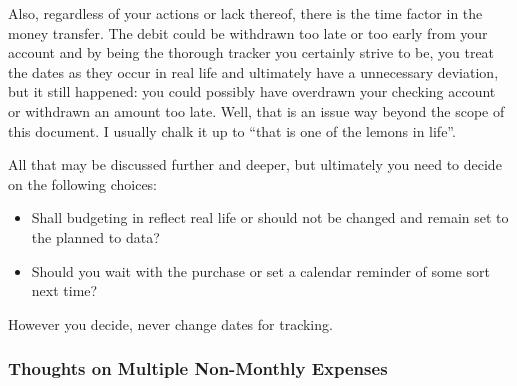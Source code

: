 Also, regardless of your actions or lack thereof, there is the time factor in the money transfer.
The debit could be withdrawn too late or too early from your account and by being the thorough tracker you certainly strive to be, you treat the dates as they occur in real life and ultimately have a unnecessary deviation, but it still happened: you could possibly have overdrawn your checking account or withdrawn an amount too late.
Well, that is an issue way beyond the scope of this document.
I usually chalk it up to ``that is one of the lemons in life''.

All that may be discussed further and deeper, but ultimately you need to decide on the following choices:
\begin{itemize}
	\item Shall budgeting in \tfn reflect real life or should \tfn not be changed and remain set to the planned to data?
	\item Should you wait with the purchase or set a calendar reminder of some sort next time?
\end{itemize}
\begin{specialnote}
	However you decide, never change dates for tracking.
\end{specialnote}

\subsubsection{Thoughts on Multiple Non-Monthly Expenses}
\label{subsubsec:thoughts-non-monthly-expenses}

